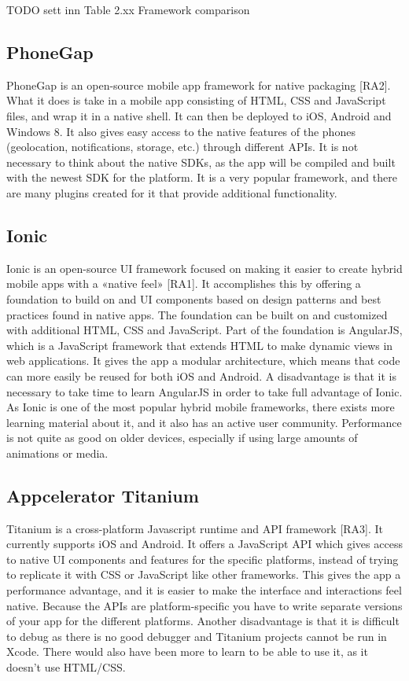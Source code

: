 TODO sett inn Table 2.xx Framework comparison\newline

\subsection{PhoneGap}

PhoneGap is an open-source mobile app framework for native packaging [RA2]. What it does is take in a mobile app consisting of HTML, CSS and JavaScript files, and wrap it in a native shell. It can then be deployed to iOS, Android and Windows 8. It also gives easy access to the native features of the phones (geolocation, notifications, storage, etc.) through different APIs. It is not necessary to think about the native SDKs, as the app will be compiled and built with the newest SDK for the platform.  It is a very popular framework, and there are many plugins created for it that provide additional functionality.

\subsection{Ionic}

Ionic is an open-source UI framework focused on making it easier to create hybrid mobile apps with a «native feel» [RA1]. It accomplishes this by offering a foundation to build on and UI components based on design patterns and best practices found in native apps. The foundation can be built on and customized with additional HTML, CSS and JavaScript. Part of the foundation is AngularJS, which is a JavaScript framework that extends HTML to make dynamic views in web applications. It gives the app a modular architecture, which means that code can more easily be reused for both iOS and Android. A disadvantage is that it is necessary to take time to learn AngularJS in order to take full advantage of Ionic. As Ionic is one of the most popular hybrid mobile frameworks, there exists more learning material about it, and it also has an active user community. Performance is not quite as good on older devices, especially if using large amounts of animations or media.

\subsection{Appcelerator Titanium}

Titanium is a cross-platform Javascript runtime and API framework [RA3]. It currently supports iOS and Android. It offers a JavaScript API which gives access to native UI components and features for the specific platforms, instead of trying to replicate it with CSS or JavaScript like other frameworks. This gives the app a performance advantage, and it is easier to make the interface and interactions feel native. Because the APIs are platform-specific you have to write separate versions of your app for the different platforms. Another disadvantage is that it is difficult to debug as there is no good debugger and Titanium projects cannot be run in Xcode. There would also have been more to learn to be able to use it, as it doesn’t use HTML/CSS.


